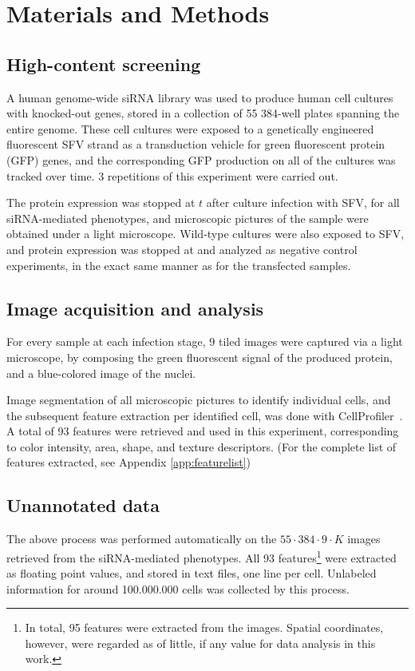 \documentclass[oneside, a4paper, draft]{memoir} %
\begin{document}
\section{Materials and Methods}
\subsection{High-content screening}
A human genome-wide siRNA library was used to produce human cell cultures with knocked-out
genes, stored in a collection of 55 384-well plates spanning the entire genome. 
These cell cultures were exposed to a genetically engineered fluorescent SFV strand as a transduction vehicle for 
green fluorescent protein (GFP) genes, and the corresponding GFP production on all of the cultures was tracked over
time. 3 repetitions of this experiment were carried out.

The protein expression was stopped at $t$ after culture infection with SFV, for all siRNA-mediated
phenotypes, and microscopic pictures of the sample were obtained under a light microscope.
Wild-type cultures were also exposed to SFV, and protein expression was stopped at 
and analyzed as negative control experiments, in the exact same manner as for the  transfected
samples.


\subsection{Image acquisition and analysis}
For every sample at each infection stage, 9 tiled images were captured via a light microscope, by composing the
green fluorescent signal of the produced protein, and a blue-colored image of the nuclei.

Image segmentation of all microscopic pictures to identify individual cells, and the subsequent feature extraction per
identified cell, was done with CellProfiler~\cite{carpenter2006cellprofiler}.
A total of 93 features were retrieved and used in this experiment, corresponding to color intensity, area, shape, and
texture descriptors. (For the complete list of features extracted, see Appendix \ref{app:featurelist})

\subsection{Unannotated data}
The above process was performed automatically on the  $55 \cdot 384 \cdot 9 \cdot K$
images retrieved from the siRNA-mediated phenotypes. All 93 features\footnote{In total, 95 features were extracted
from the images. Spatial coordinates, however, were regarded as of little, if any value for data analysis in this
work.} were extracted as floating point values, and stored in text files, one line per cell. Unlabeled information for
around 100.000.000 cells was collected by this process.
\end{document}
